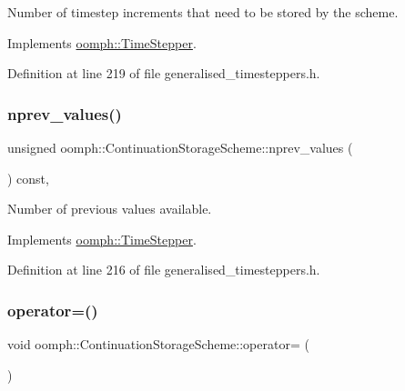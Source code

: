 Number of timestep increments that need to be stored by the scheme. 



Implements \hyperlink{classoomph_1_1TimeStepper_a00e57b6436cff4fc82af481b81a78a1a}{oomph\+::\+Time\+Stepper}.



Definition at line 219 of file generalised\+\_\+timesteppers.\+h.

\mbox{\label{classoomph_1_1ContinuationStorageScheme_a895e0f4bc35dc3cae52fcee71db86de3}} 
\subsubsection{\texorpdfstring{nprev\+\_\+values()}{nprev\_values()}}
{\footnotesize\ttfamily unsigned oomph\+::\+Continuation\+Storage\+Scheme\+::nprev\+\_\+values (\begin{DoxyParamCaption}{ }\end{DoxyParamCaption}) const\hspace{0.3cm}{\ttfamily [inline]}, {\ttfamily [virtual]}}



Number of previous values available. 



Implements \hyperlink{classoomph_1_1TimeStepper_a0f38713ed304c18d9f7b5cf8131664c1}{oomph\+::\+Time\+Stepper}.



Definition at line 216 of file generalised\+\_\+timesteppers.\+h.

\mbox{\label{classoomph_1_1ContinuationStorageScheme_a27c17cf31af802a84973b02d13268f89}} 
\subsubsection{\texorpdfstring{operator=()}{operator=()}}
{\footnotesize\ttfamily void oomph\+::\+Continuation\+Storage\+Scheme\+::operator= (\begin{DoxyParamCaption}\item[{const \hyperlink{classoomph_1_1ContinuationStorageScheme}{Continuation\+Storage\+Scheme} \&}]{ }\end{DoxyParamCaption})\hspace{0.3cm}{\ttfamily [inline]}}




